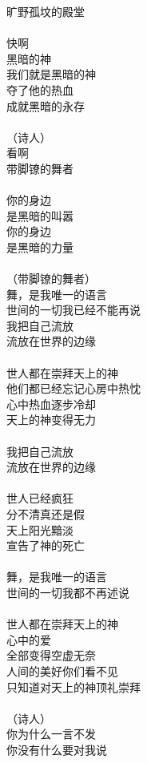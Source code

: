 旷野孤坟的殿堂\\
\\
快啊\\
黑暗的神\\
我们就是黑暗的神\\
夺了他的热血\\
成就黑暗的永存\\
\\
（诗人）\\
看啊\\
带脚镣的舞者\\
\\
你的身边\\
是黑暗的叫嚣\\
你的身边\\
是黑暗的力量\\
\\
（带脚镣的舞者）\\
舞，是我唯一的语言\\
世间的一切我已经不能再说\\
我把自己流放\\
流放在世界的边缘\\
\\
世人都在崇拜天上的神\\
他们都已经忘记心房中热忱\\
心中热血逐步冷却\\
天上的神变得无力\\
\\
我把自己流放\\
流放在世界的边缘\\
\\
世人已经疯狂\\
分不清真还是假\\
天上阳光黯淡\\
宣告了神的死亡\\
\\
舞，是我唯一的语言\\
世间的一切我都不再述说\\
\\
世人都在崇拜天上的神\\
心中的爱\\
全部变得空虚无奈\\
人间的美好你们看不见\\
只知道对天上的神顶礼崇拜\\
\\
（诗人）\\
你为什么一言不发\\
你没有什么要对我说\\
